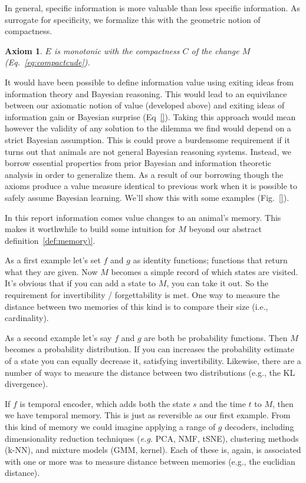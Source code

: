 \documentclass[9pt,twocolumn,twoside]{pnas-new}
\newtheorem{axiom}{Axiom}
\begin{document}
\noindent
In general, specific information is more valuable than less specific information. As surrogate for specificity, we formalize this with the geometric notion of compactness.
\begin{axiom}
    $E$ is monotonic with the compactness $C$ of the change $M$ (Eq.~\ref{eq:compactcude}).
    \label{ax:5}
\end{axiom}
\noindent


It would have been possible to define information value using exiting ideas from information theory and Bayesian reasoning. This would lead to an equivilance between our axiomatic notion of value (developed above) and exiting ideas of information gain or Bayesian surprise (Eq~\ref{}). Taking this approach would mean however the validity of any solution to the dilemma we find would depend on a strict Bayesian assumption. This is could prove a burdensome requirement if it turns out that animals are not general Bayesian reasoning systems. Instead, we borrow essential properties from prior Bayesian and information theoretic analysis in order to generalize them. As a result of our borrowing though the axioms produce a value measure identical to previous work when it is possible to safely assume Bayesian learning. We'll show this with some examples (Fig.~\ref{}).

In this report information comes value changes to an animal's memory. This makes it worthwhile to build some intuition for $M$ beyond our abstract definition~\ref{def:memory)}. 

As a first example let's set $f$ and $g$ as identity functions; functions that return what they are given. Now $M$ becomes a simple record of which states are visited. It's obvious that if you can add a state to $M$, you can take it out. So the requirement for invertibility / forgettability is met. One way to measure the distance between two memories of this kind is to compare their size (i.e., cardinality).

As a second example let's say $f$ and $g$ are both be probability functions. Then $M$ becomes a probability distribution. If you can increases the probability estimate of a state you can equally decrease it, satisfying invertibility. Likewise, there are a number of ways to measure the distance between two distributions (e.g., the KL divergence).

If $f$ is temporal encoder, which adds both the state $s$ and the time $t$ to $M$, then we have temporal memory. This is just as reversible as our first example. From this kind of memory we could imagine applying a range of $g$ decoders, including dimensionality reduction techniques (\textit{e.g.} PCA, NMF, tSNE), clustering methods (k-NN), and mixture models (GMM, kernel). Each of these is, again, is associated with one or more was to measure distance between memories (e.g., the euclidian distance).
\end{document}
